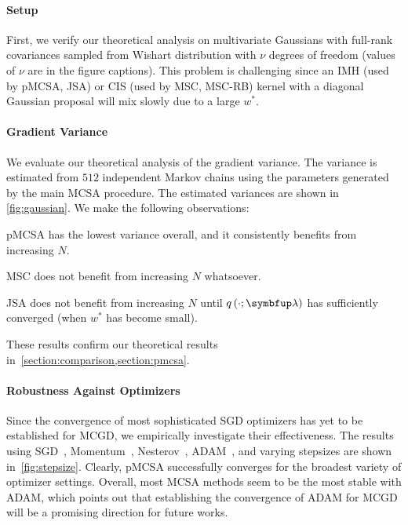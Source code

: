 \paragraph{Setup}
First, we verify our theoretical analysis on multivariate Gaussians with full-rank covariances sampled from Wishart distribution with \(\nu\) degrees of freedom (values of \(\nu\) are in the figure captions).
This problem is challenging since an IMH (used by pMCSA, JSA) or CIS (used by MSC, MSC-RB) kernel with a diagonal Gaussian proposal will mix slowly due to a large \(w^*\).

\vspace{-0.1in}
\paragraph{Gradient Variance}
We evaluate our theoretical analysis of the gradient variance.
The variance is estimated from \(512\) independent Markov chains using the parameters generated by the main MCSA procedure.
The estimated variances are shown in \cref{fig:gaussian}.
We make the following observations:
\begin{enumerate*}[label=\textbf{(\roman*)}]
  \item pMCSA has the lowest variance overall, and it consistently benefits from increasing \(N\).
  \item MSC does not benefit from increasing \(N\) whatsoever.
  \item JSA does not benefit from increasing \(N\) until \(q\left(\cdot; \vlambda\right)\) has sufficiently converged (when \(w^*\) has become small).
\end{enumerate*}
These results confirm our theoretical results in~\cref{section:comparison,section:pmcsa}.

\vspace{-0.1in}
\paragraph{Robustness Against Optimizers}
Since the convergence of most sophisticated SGD optimizers has yet to be established for MCGD, we empirically investigate their effectiveness.
The results using SGD~\citep{robbins_stochastic_1951, bottou_optimization_2018a}, Momentum~\citep{polyak_methods_1964}, Nesterov~\citep{nesterov_method_1983}, ADAM~\citep{kingma_adam_2015}, and varying stepsizes are shown in~\cref{fig:stepsize}.
Clearly, pMCSA successfully converges for the broadest variety of optimizer settings.
Overall, most MCSA methods seem to be the most stable with ADAM, which points out that establishing the convergence of ADAM for MCGD will be a promising direction for future works.

